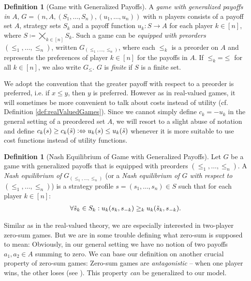 \documentclass[a4paper,DIV=11,abstracton,twoside=semi]{scrreprt}
\theoremstyle{definition}
\newtheorem{defn}[thm]{Definition} %
\begin{document}
    \begin{defn}[Game with Generalized Payoffs]
        A \emph{game with generalized payoffs in $A$}, $G = (n, A, (S_1, \dots, S_n), (u_1, \dots, u_n))$ with $n$ players consists of a payoff set $A$, strategy sets $S_k$ and a payoff function $u_k: S \to A$ for each player $k \in [n]$, where $S \coloneqq \bigtimes_{k \in [n]} S_k$.        
        Such a game can be \emph{equipped with preorders} $(\leq_1, \dots, \leq_n)$, written $G_{(\leq_1, \dots, \leq_n)}$, where each $\leq_k$ is a preorder on $A$ and represents the preferences of player $k \in [n]$ for the payoffs in $A$.
        If $\leq_k \mathbin{=} \leq$ for all $k \in [n]$, we also write $G_\leq$.
        $G$ is \emph{finite} if $S$ is a finite set.
    \end{defn}
    We adopt the convention that the greater payoff with respect to a preorder is preferred, i.e. if $x \leq y$, then $y$ is preferred. However as in real-valued games, it will sometimes be more convenient to talk about costs instead of utility (cf. Definition \ref{def:realValuedGames}). Since we cannot simply define $c_k = -u_k$ in the general setting of a preordered set $A$, we will resort to a slight abuse of notation and define $c_k(s) \geq c_k(\tilde{s}) \mathrel{\vcentcolon\Leftrightarrow} u_k(s) \leq u_k(\tilde{s})$ whenever it is more suitable to use cost functions instead of utility functions.
    
    \begin{defn}[Nash Equilibrium of Game with Generalized Payoffs]
        Let $G$ be a game with generalized payoffs that is equipped with preorders $(\leq_1, \dots, \leq_n)$.
        A \emph{Nash equilibrium of} $G_{(\leq_1, \dots, \leq_n)}$ (or a \emph{Nash equilibrium of $G$ with respect to $(\leq_1, \dots, \leq_n)$})
        is a strategy profile $s = (s_1, \dots, s_n) \in S$ such that for each player $k \in [n]$:
        \begin{gather}
            \forall \tilde{s}_k \in S_k: u_k(s_k, s_{-k}) \geq_k u_k(\tilde{s}_k, s_{-k}).
            \label{eq:nashEquilibriumGeneralizedPayoffs}
        \end{gather}
    \end{defn}
    
    Similar as in the real-valued theory, we are especially interested in two-player zero-sum games.
    But we are in some trouble defining what zero-sum is supposed to mean: Obviously, in our general setting we have no notion of two payoffs $a_1, a_2 \in A$ summing to zero.
    We can base our definition on another crucial property of zero-sum games: Zero-sum games are \emph{antagonistic} -- when one player wins, the other loses (see \cite{bib:andersonAntagonisticGames}). This property \emph{can} be generalized to our model.
    
\end{document}
